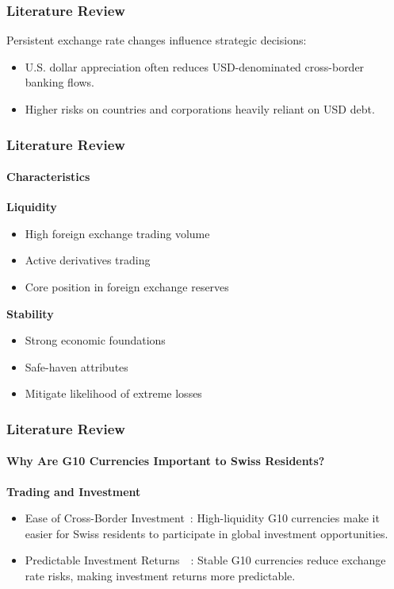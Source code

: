 \documentclass[10pt]{beamer}
\begin{document}
\begin{frame}
\frametitle{Literature Review}
Persistent exchange rate changes influence strategic decisions:~\cite{riker2020review}
\begin{itemize}
    \item U.S. dollar appreciation often reduces USD-denominated cross-border banking flows.~\cite{dollar_exchange}
    \item Higher risks on countries and corporations heavily reliant on USD debt.~\cite{dollar_exchange}
\end{itemize}
\end{frame}
\begin{frame}
\frametitle{Literature Review}
\framesubtitle{Characteristics}
\textbf{Liquidity}~\cite{rogoff2000six}
\begin{itemize}
    \item High foreign exchange trading volume
    \item Active derivatives trading
    \item Core position in foreign exchange reserves
\end{itemize}
\textbf{Stability}~\cite{campbell2002strategic}~\cite{engel2016exchange}
\begin{itemize}
    \item Strong economic foundations
    \item Safe-haven attributes
    \item Mitigate likelihood of extreme losses
\end{itemize}
\end{frame}
\begin{frame}
\frametitle{Literature Review}
\framesubtitle{Why Are G10 Currencies Important to Swiss Residents?}
\textbf{Trading and Investment}
\begin{itemize}
    \item Ease of Cross-Border Investment~\cite{rogoff2000six}: High-liquidity G10 currencies make it easier for Swiss residents to participate in global investment opportunities.
    \item Predictable Investment Returns~\cite{campbell2002strategic}~\cite{engel2016exchange}: Stable G10 currencies reduce exchange rate risks, making investment returns more predictable.
\end{itemize}
\end{frame}
\end{document}
